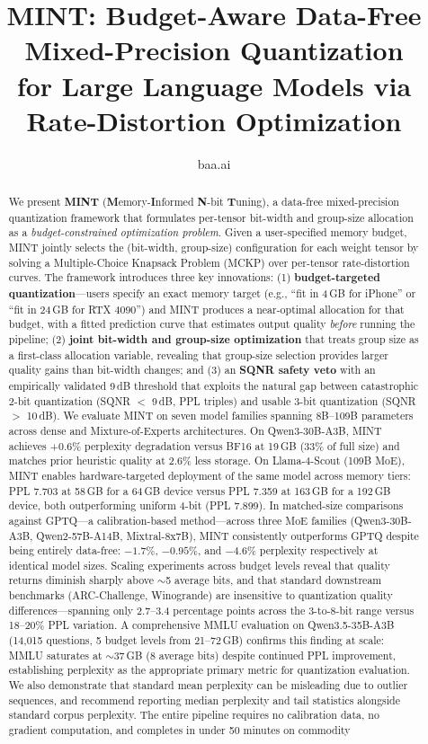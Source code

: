 \documentclass{article}
\title{MINT: Budget-Aware Data-Free Mixed-Precision Quantization\\for Large Language Models via Rate-Distortion Optimization}
\author{
  baa.ai
}
\begin{document}
\maketitle

\begin{abstract}
We present \textbf{MINT} (\textbf{M}emory-\textbf{I}nformed \textbf{N}-bit \textbf{T}uning), a data-free mixed-precision quantization framework that formulates per-tensor bit-width and group-size allocation as a \emph{budget-constrained optimization problem}. Given a user-specified memory budget, MINT jointly selects the (bit-width, group-size) configuration for each weight tensor by solving a Multiple-Choice Knapsack Problem (MCKP) over per-tensor rate-distortion curves. The framework introduces three key innovations: (1) \textbf{budget-targeted quantization}---users specify an exact memory target (e.g., ``fit in 4\,GB for iPhone'' or ``fit in 24\,GB for RTX 4090'') and MINT produces a near-optimal allocation for that budget, with a fitted prediction curve that estimates output quality \emph{before} running the pipeline; (2) \textbf{joint bit-width and group-size optimization} that treats group size as a first-class allocation variable, revealing that group-size selection provides larger quality gains than bit-width changes; and (3) an \textbf{SQNR safety veto} with an empirically validated 9\,dB threshold that exploits the natural gap between catastrophic 2-bit quantization (SQNR $<$ 9\,dB, PPL triples) and usable 3-bit quantization (SQNR $>$ 10\,dB). We evaluate MINT on seven model families spanning 8B--109B parameters across dense and Mixture-of-Experts architectures. On Qwen3-30B-A3B, MINT achieves +0.6\% perplexity degradation versus BF16 at 19\,GB (33\% of full size) and matches prior heuristic quality at 2.6\% less storage. On Llama-4-Scout (109B MoE), MINT enables hardware-targeted deployment of the same model across memory tiers: PPL 7.703 at 58\,GB for a 64\,GB device versus PPL 7.359 at 163\,GB for a 192\,GB device, both outperforming uniform 4-bit (PPL 7.899). In matched-size comparisons against GPTQ---a calibration-based method---across three MoE families (Qwen3-30B-A3B, Qwen2-57B-A14B, Mixtral-8x7B), MINT consistently outperforms GPTQ despite being entirely data-free: $-1.7\%$, $-0.95\%$, and $-4.6\%$ perplexity respectively at identical model sizes. Scaling experiments across budget levels reveal that quality returns diminish sharply above ${\sim}$5 average bits, and that standard downstream benchmarks (ARC-Challenge, Winogrande) are insensitive to quantization quality differences---spanning only 2.7--3.4 percentage points across the 3-to-8-bit range versus 18--20\% PPL variation. A comprehensive MMLU evaluation on Qwen3.5-35B-A3B (14{,}015 questions, 5 budget levels from 21--72\,GB) confirms this finding at scale: MMLU saturates at ${\sim}$37\,GB (8 average bits) despite continued PPL improvement, establishing perplexity as the appropriate primary metric for quantization evaluation. We also demonstrate that standard mean perplexity can be misleading due to outlier sequences, and recommend reporting median perplexity and tail statistics alongside standard corpus perplexity. The entire pipeline requires no calibration data, no gradient computation, and completes in under 50 minutes on commodity 
\end{abstract}
\end{document}
